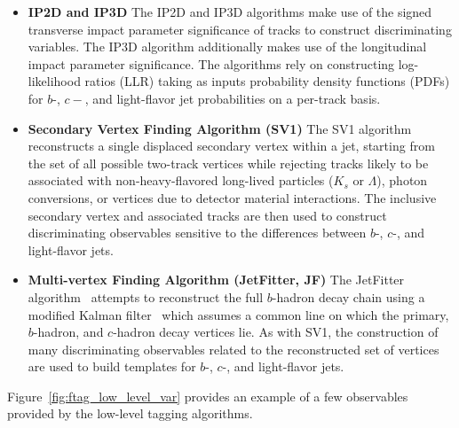 \begin{itemize}
    \item{\textbf{IP2D and IP3D}} The IP2D and IP3D algorithms make use of the signed transverse impact parameter significance of tracks
        to construct discriminating variables. The IP3D algorithm additionally makes use of the longitudinal impact parameter
        significance. The algorithms rely on constructing log-likelihood ratios (LLR) taking as inputs probability density functions (PDFs)
        for $b$-, $c-$, and light-flavor jet probabilities on a per-track basis.
    \item{\textbf{Secondary Vertex Finding Algorithm (SV1)}} The SV1 algorithm~\cite{SV1} reconstructs a single displaced secondary vertex within
        a jet, starting from the set of all possible two-track vertices while rejecting tracks likely to be associated with
        non-heavy-flavored long-lived particles ($K_s$ or $\Lambda$), photon conversions, or vertices due to detector material interactions.
        The inclusive secondary vertex and associated tracks are then used to construct discriminating observables sensitive to the differences
        between $b$-, $c$-, and light-flavor jets.
    \item{\textbf{Multi-vertex Finding Algorithm (JetFitter, JF)}} The JetFitter algorithm~\cite{JETFITTER} attempts to reconstruct the full
        $b$-hadron decay chain using a modified Kalman filter~\cite{KalmanFilter} which assumes a common line on which the primary, $b$-hadron,
        and $c$-hadron decay vertices lie. As with SV1, the construction of many discriminating observables related to the
        reconstructed set of vertices are used to build templates for $b$-, $c$-, and light-flavor jets.
\end{itemize}

Figure~\ref{fig:ftag_low_level_var} provides an example of a few observables provided by the low-level tagging algorithms.

